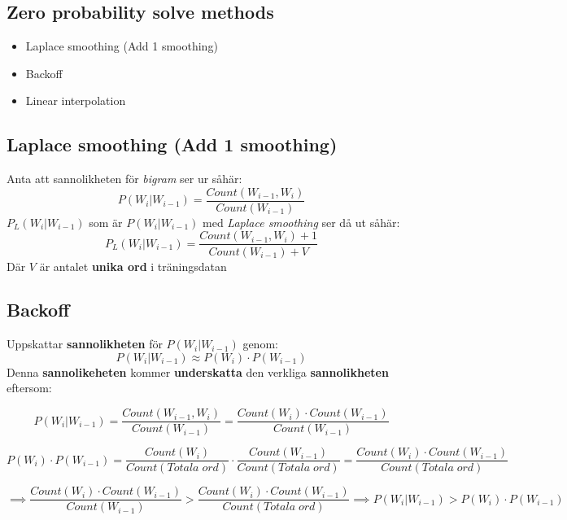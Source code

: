 \documentclass[12pt,a4paper]{article}
\begin{document}
\subsection*{Zero probability solve methods}
\begin{itemize}
    \item Laplace smoothing (Add 1 smoothing)
    \item Backoff
    \item Linear interpolation
\end{itemize}
\newpage
\subsection*{Laplace smoothing (Add 1 smoothing)}
Anta att sannolikheten för \textit{bigram} ser ur såhär: 
{\large $$P(W_i|W_{i-1}) = \frac{Count(W_{i-1}, W_i)}{Count(W_{i-1})}$$}
\newline
$P_L(W_i|W_{i-1})$ som är $P(W_i|W_{i-1})$ med \textit{Laplace smoothing} ser då ut såhär:
{\large
$$P_L(W_i|W_{i-1}) = \frac{Count(W_{i-1}, W_i) +1}{Count(W_{i-1}) + V}$$
}
Där $V$ är antalet \textbf{unika ord} i träningsdatan
\newline
\newline

\noindent\hrulefill

\subsection*{Backoff}
Uppskattar \textbf{sannolikheten} för {$P(W_i|W_{i-1})$} genom:
{\large $$P(W_i|W_{i-1}) \approx P(W_i) \cdot P(W_{i-1})$$}
Denna \textbf{sannolikeheten} kommer \textbf{underskatta} den verkliga \textbf{sannolikheten} eftersom:
\newline
\newline

$$P(W_i|W_{i-1}) = \frac{Count(W_{i-1}, W_i)}{Count(W_{i-1})} = \frac{Count(W_{i}) \cdot Count(W_{i-1})}{Count(W_{i-1})}$$

$$P(W_i) \cdot P(W_{i-1}) = \frac{Count(W_i)}{Count(Totala \; ord)} \cdot \frac{Count(W_{i-1})}{Count(Totala \; ord)} = \frac{Count(W_{i}) \cdot Count(W_{i-1})}{Count(Totala \; ord)}$$

$$\implies \frac{Count(W_{i}) \cdot Count(W_{i-1})}{Count(W_{i-1})} > \frac{Count(W_{i}) \cdot Count(W_{i-1})}{Count(Totala \; ord)} \implies P(W_i|W_{i-1}) > P(W_i) \cdot P(W_{i-1})$$ 
\newline
\newline
\end{document}
